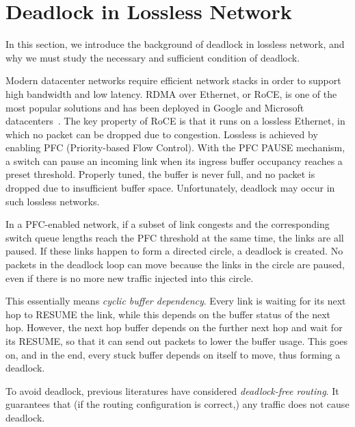 \secspace
\section{Deadlock in Lossless Network}
\secspace

In this section, we introduce the background of deadlock in lossless network, and
why we must study the necessary and sufficient condition of deadlock.

Modern datacenter networks require efficient network stacks in order to support
high bandwidth and low latency. RDMA over Ethernet, or RoCE, is one of the most popular
solutions and has been deployed in Google and Microsoft datacenters~\cite{dcqcn, timely}.
The key property of RoCE is that it runs on a lossless Ethernet, in which no packet can be dropped due to congestion.
Lossless is achieved by enabling PFC
(Priority-based Flow Control). With the PFC PAUSE mechanism, a switch can pause an incoming link
when its ingress buffer occupancy reaches a preset threshold. Properly tuned, the
buffer is never full, and no packet is dropped due to insufficient buffer space.
Unfortunately, deadlock may occur in such lossless networks.



In a PFC-enabled network, if a subset of link congests and the corresponding switch queue lengths reach
the PFC threshold at the same time, the links are all paused. If these links happen
to form a directed circle, a deadlock is created. No packets in the deadlock loop can move because
the links in the circle are paused, even if there is no more new traffic injected into this circle.

This essentially means {\em cyclic buffer dependency}. Every link is waiting for its next
hop to RESUME the link, while this depends on the buffer status of the next hop. However,
the next hop buffer depends on the further next hop and wait for its RESUME,
so that it can send out packets to lower the buffer usage. This goes on, and in the end,
every stuck buffer depends on itself to move, thus forming a deadlock.

To avoid deadlock, previous literatures have considered {\em deadlock-free routing}. It
guarantees that (if the routing configuration is correct,) any traffic does not
cause deadlock.

